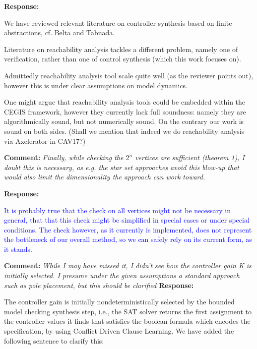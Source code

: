 \documentclass{article}
\newcommand{\rev}[1]{\textcolor{blue}{#1}}
\begin{document}
\vspace{1em}
{\bf Response: }

We have reviewed relevant literature on controller synthesis based on finite abstractions, cf. Belta and Tabuada. 

Literature on reachability analysis tackles a different problem, namely one of verification, rather than one of control synthesis (which this work
focuses on). 

Admittedly reachability analysis tool scale quite well (as the reviewer points out), however this is under clear assumptions on model dynamics. 

One might argue that reachability analysis tools could be embedded within the CEGIS framework, however they currently lack full soundness: namely they
are algorithmically sound, but not numerically sound. On the contrary our work is sound on both sides. (Shall we mention that indeed we do
reachability analysis via Axelerator in CAV17?)

\vspace{2em}
{\bf Comment: }
{\itshape Finally, while checking the $2^n$ vertices
are sufficient (theorem 1), I doubt this is necessary, as e.g. the star set approaches avoid this blow-up that would also limit the dimensionality
the approach can work toward.}
\vspace{1em}

{\bf Response: }

\rev{It is probably true that the check on all vertices might not be necessary in general, that that this check might be simplified in special cases
or under special conditions. The check however, as it currently is implemented, does not represent the bottleneck of our overall method, so we can
safely rely on its current form, as it stands. }

\vspace{2em}

{\bf Comment: }
{\itshape While I may have missed it, I didn't see how the controller gain K is initially selected. I presume under the given assumptions a standard
approach
such as pole placement, but this should be clarified}
\vspace{1em}
{\bf Response: }

The controller gain is initially nondeterministically selected by the bounded model checking synthesis step, i.e., the SAT solver returns the first
assignment to the controller
values it finds
that satisfies the boolean formula which encodes the specification, by using Conflict Driven Clause Learning.
We have added the following sentence to clarify this:
\end{document}
